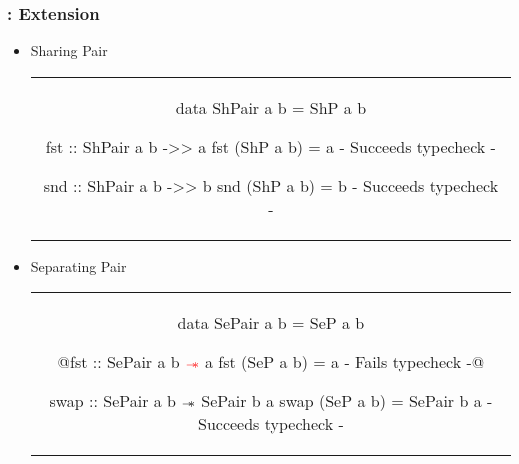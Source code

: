 \begin{frame}[fragile, c]
  \frametitle{\qub{}: Extension}
  \begin{center}
    \begin{itemize}
    \item<1-> Sharing Pair

      \begin{center}
        \begin{tabular}[c]{c}
          \begin{haskell}
data ShPair a b = ShP a b

fst :: ShPair a b ->> a
fst (ShP a b) = a              {- Succeeds typecheck -}

snd :: ShPair a b ->> b
snd (ShP a b) = b              {- Succeeds typecheck -}
          \end{haskell}
        \end{tabular}
      \end{center}
    \item<2-> Separating Pair
      \begin{center}
       \begin{tabular}[c]{c}
          \begin{haskell}
data SePair a b = SeP a b

@fst :: SePair a b ${\color{red}\mathrel{-\mkern-6mu*}}$ a
fst (SeP a b) = a              {- Fails typecheck -}@

swap :: SePair a b $\mathrel{-\mkern-6mu*}$ SePair b a
swap (SeP a b) = SePair b a    {- Succeeds typecheck -}
          \end{haskell}
        \end{tabular}
      \end{center}
    \end{itemize}
  \end{center}
\end{frame}



